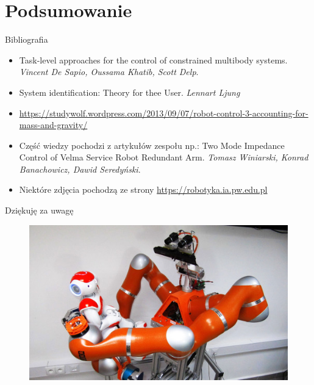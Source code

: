 \documentclass{beamer}
\begin{document}
\section{Podsumowanie}
\begin{frame}{Bibliografia}
\begin{itemize}
	\item Task-level approaches for the control of constrained multibody systems. \textit{Vincent De Sapio, Oussama Khatib, Scott Delp}.
	\item System identification: Theory for thee User. \textit{Lennart Ljung}
	\item \url{https://studywolf.wordpress.com/2013/09/07/robot-control-3-accounting-for-mass-and-gravity/}
	\item Część wiedzy pochodzi z artykułów zespołu np.: Two Mode Impedance Control of Velma Service Robot Redundant Arm.
	\textit{Tomasz Winiarski, Konrad Banachowicz, Dawid Seredyński}.
	\item Niektóre zdjęcia pochodzą ze strony \url{https://robotyka.ia.pw.edu.pl}

\end{itemize}

\end{frame}
\begin{frame}{Dziękuję za uwagę}
\begin{figure}[h]
	\centering
	\includegraphics[scale=1.4]{velma3}
\end{figure}
\end{frame}
\end{document}
